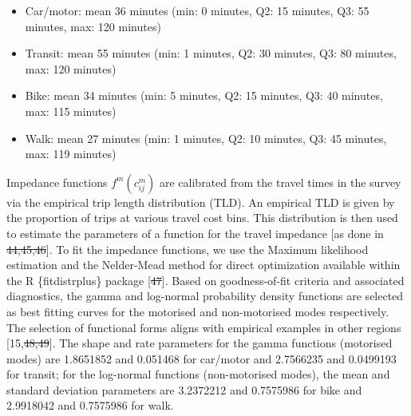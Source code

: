 \documentclass[10pt,letterpaper]{article}
\providecommand{\tightlist}{%
  \setlength{\itemsep}{0pt}\setlength{\parskip}{0pt}}
\providecommand{\DIFaddtex}[1]{{\protect\color{blue}\uwave{#1}}} %
\providecommand{\DIFdeltex}[1]{{\protect\color{red}\sout{#1}}}                      %
\providecommand{\DIFaddbegin}{} %
\providecommand{\DIFaddend}{} %
\providecommand{\DIFdelbegin}{} %
\providecommand{\DIFdelend}{} %
\providecommand{\DIFadd}[1]{\texorpdfstring{\DIFaddtex{#1}}{#1}} %
\providecommand{\DIFdel}[1]{\texorpdfstring{\DIFdeltex{#1}}{}} %
\newcommand{\DIFscaledelfig}{0.5}
\newlength{\DIFdelgraphicswidth} %
\newlength{\DIFdelgraphicsheight} %
\newcommand{\DIFaddincludegraphics}[2][]{{\color{blue}\fbox{\DIFOincludegraphics[#1]{#2}}}} %
\newcommand{\DIFdelincludegraphics}[2][]{%
\sbox{\DIFdelgraphicsbox}{\DIFOincludegraphics[#1]{#2}}%
\settoboxwidth{\DIFdelgraphicswidth}{\DIFdelgraphicsbox} %
\settoboxtotalheight{\DIFdelgraphicsheight}{\DIFdelgraphicsbox} %
\scalebox{\DIFscaledelfig}{%
\parbox[b]{\DIFdelgraphicswidth}{\usebox{\DIFdelgraphicsbox}\\[-\baselineskip] \rule{\DIFdelgraphicswidth}{0em}}\llap{\resizebox{\DIFdelgraphicswidth}{\DIFdelgraphicsheight}{%
\setlength{\unitlength}{\DIFdelgraphicswidth}%
\begin{picture}(1,1)%
\thicklines\linethickness{2pt} %
{\color[rgb]{1,0,0}\put(0,0){\framebox(1,1){}}}%
{\color[rgb]{1,0,0}\put(0,0){\line( 1,1){1}}}%
{\color[rgb]{1,0,0}\put(0,1){\line(1,-1){1}}}%
\end{picture}%
}\hspace*{3pt}}} %
} %
\DeclareRobustCommand{\DIFaddbegin}{\DIFOaddbegin \let\includegraphics\DIFaddincludegraphics} %
\DeclareRobustCommand{\DIFaddend}{\DIFOaddend \let\includegraphics\DIFOincludegraphics} %
\DeclareRobustCommand{\DIFdelbegin}{\DIFOdelbegin \let\includegraphics\DIFdelincludegraphics} %
\DeclareRobustCommand{\DIFdelend}{\DIFOaddend \let\includegraphics\DIFOincludegraphics} %
\begin{document}
\begin{itemize}
\tightlist
\item
  Car/motor: mean 36 minutes (min: 0 minutes, Q2: 15 minutes, Q3: 55
  minutes, max: 120 minutes)
\item
  Transit: mean 55 minutes (min: 1 minutes, Q2: 30 minutes, Q3: 80
  minutes, max: 120 minutes)
\item
  Bike: mean 34 minutes (min: 5 minutes, Q2: 15 minutes, Q3: 40 minutes,
  max: 115 minutes)
\item
  Walk: mean 27 minutes (min: 1 minutes, Q2: 10 minutes, Q3: 45 minutes,
  max: 119 minutes)
\end{itemize}

Impedance functions \(f^m(c_{ij}^m)\) are calibrated from the travel
times in the survey via the empirical trip length distribution (TLD). An
empirical TLD is given by the proportion of trips at various travel cost
bins. This distribution is then used to estimate the parameters of a
function for the travel impedance {[}as done in \DIFdelbegin \DIFdel{44,45,46}\DIFdelend \DIFaddbegin \DIFadd{55,56,57}\DIFaddend {]}. To fit the
impedance functions, we use the Maximum likelihood estimation and the
Nelder-Mead method for direct optimization available within the R
\{fitdistrplus\} package {[}\DIFdelbegin \DIFdel{47}\DIFdelend \DIFaddbegin \DIFadd{58}\DIFaddend {]}. Based on goodness-of-fit criteria and
associated diagnostics, the gamma and log-normal probability density
functions are selected as best fitting curves for the motorised and
non-motorised modes respectively. The selection of functional forms
aligns with empirical examples in other regions {[}15,\DIFdelbegin \DIFdel{48,49}\DIFdelend \DIFaddbegin \DIFadd{59,60}\DIFaddend {]}. The
shape and rate parameters for the gamma functions (motorised modes) are
1.8651852 and 0.051468 for car/motor and 2.7566235 and 0.0499193 for
transit; for the log-normal functions (non-motorised modes), the mean
and standard deviation parameters are 3.2372212 and 0.7575986 for bike
and 2.9918042 and 0.7575986 for walk.
\end{document}
